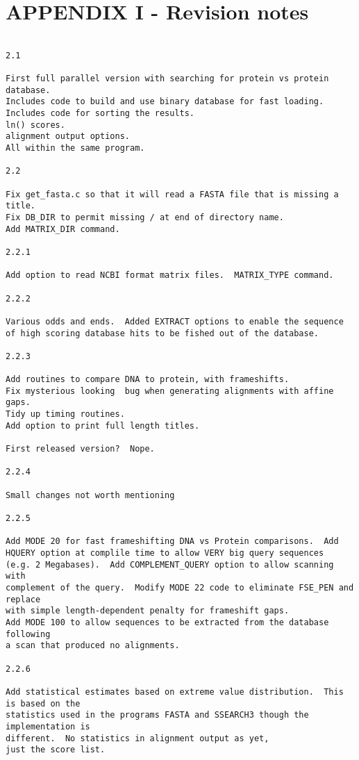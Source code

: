 \documentclass[12pt]{article}
\begin{document}
\section{APPENDIX I - Revision notes}

\begin{scriptsize}
\begin{verbatim}

2.1

First full parallel version with searching for protein vs protein database.
Includes code to build and use binary database for fast loading.
Includes code for sorting the results.
ln() scores.
alignment output options.
All within the same program.

2.2

Fix get_fasta.c so that it will read a FASTA file that is missing a title.
Fix DB_DIR to permit missing / at end of directory name.
Add MATRIX_DIR command.

2.2.1

Add option to read NCBI format matrix files.  MATRIX_TYPE command.

2.2.2

Various odds and ends.  Added EXTRACT options to enable the sequence
of high scoring database hits to be fished out of the database.

2.2.3

Add routines to compare DNA to protein, with frameshifts.  
Fix mysterious looking  bug when generating alignments with affine gaps.  
Tidy up timing routines.
Add option to print full length titles.

First released version?  Nope.

2.2.4

Small changes not worth mentioning

2.2.5

Add MODE 20 for fast frameshifting DNA vs Protein comparisons.  Add
HQUERY option at complile time to allow VERY big query sequences
(e.g. 2 Megabases).  Add COMPLEMENT_QUERY option to allow scanning with 
complement of the query.  Modify MODE 22 code to eliminate FSE_PEN and replace
with simple length-dependent penalty for frameshift gaps.
Add MODE 100 to allow sequences to be extracted from the database following
a scan that produced no alignments.

2.2.6

Add statistical estimates based on extreme value distribution.  This is based on the 
statistics used in the programs FASTA and SSEARCH3 though the implementation is
different.  No statistics in alignment output as yet,
just the score list.


\end{verbatim}
\end{scriptsize}
\end{document}
